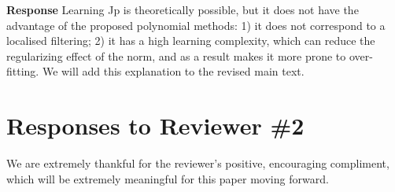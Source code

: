 \documentclass[11pt,onecolumn,journal]{IEEEtran}
\theoremstyle{definition}
\begin{document}
\textbf{Response}
Learning Jp is theoretically possible, but it does not have the advantage of the proposed polynomial methods: 1) it does not correspond to a localised filtering; 2) it has a high learning complexity, which can reduce the regularizing effect of the norm, and as a result makes it more prone to over-fitting. We will add this explanation to the revised main text.


\section*{Responses to Reviewer \#2}

We are extremely thankful for the reviewer's positive, encouraging compliment, which will be extremely meaningful for this paper moving forward.
\fi


\end{document}
